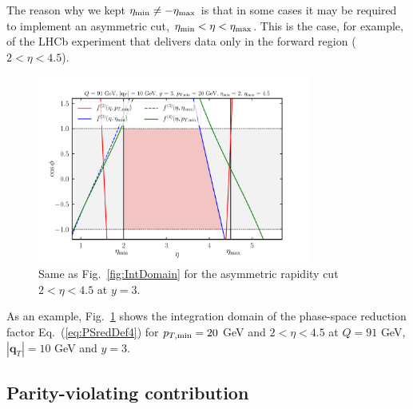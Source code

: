 \documentclass[10pt,a4paper]{article}
\begin{document}
The reason why we kept $\eta_{\rm min} \neq -\eta_{\rm max}$ is that
in some cases it may be required to implement an asymmetric cut,
$\eta_{\rm min}<\eta<\eta_{\rm max}$. This is the case, for example,
of the LHCb experiment that delivers data only in the forward region
($2 < \eta < 4.5$).
\begin{figure}[t]
  \begin{centering}
    \includegraphics[width=0.8\textwidth]{plots/IntDomainAsy.pdf}
    \caption{Same as Fig.~\ref{fig:IntDomain} for the asymmetric
      rapidity cut $2<\eta < 4.5$ at $y=3$.\label{fig:IntDomainAsy}}
  \end{centering}
\end{figure}
As an example, Fig.~\ref{fig:IntDomainAsy} shows the integration
domain of the phase-space reduction factor Eq.~(\ref{eq:PSredDef4})
for $p_{T,\rm min}=20$ GeV and $2<\eta < 4.5$ at $Q=91$ GeV,
$|\mathbf{q}_T|=10$ GeV and $y=3$.

\subsection{Parity-violating contribution}
\end{document}
